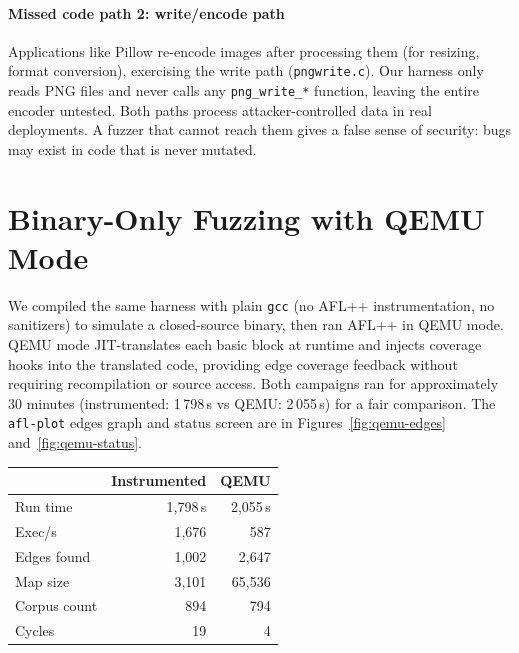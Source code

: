   \paragraph{Missed code path 2: write/encode path} Applications like Pillow re-encode images after processing them (for resizing, format conversion), exercising the write path
  (\texttt{pngwrite.c}). Our harness only reads PNG files and never calls any \texttt{png\_write\_*} function, leaving the entire encoder untested. Both paths process attacker-controlled data in real
  deployments. A fuzzer that cannot reach them gives a false sense of security: bugs may exist in code that is never mutated.
\vspace{-8pt}
\section{Binary-Only Fuzzing with QEMU Mode}
  \vspace{-7pt}
    We compiled the same harness with plain \texttt{gcc} (no AFL++
    instrumentation, no sanitizers) to simulate a closed-source binary,
    then ran AFL++ in QEMU mode. QEMU mode JIT-translates each basic
    block at runtime and injects coverage hooks into the translated code,
    providing edge coverage feedback without requiring recompilation or
    source access. Both campaigns ran for approximately 30 minutes
    (instrumented: 1\,798\,s vs QEMU: 2\,055\,s) for a fair comparison.
    The \texttt{afl-plot} edges graph and status screen are in
    Figures~\ref{fig:qemu-edges} and~\ref{fig:qemu-status}.

    \begin{table}[h]
    \centering
    \small
    \label{tab:qemu}
    \begin{tabular}{|l|r|r|}
    \hline
                      & \textbf{Instrumented} & \textbf{QEMU} \\
    \hline\hline
    Run time          & 1{,}798\,s & 2{,}055\,s \\
    Exec/s            & 1{,}676    & 587        \\
    Edges found       & 1{,}002    & 2{,}647    \\
    Map size          & 3{,}101    & 65{,}536   \\
    Corpus count      & 894        & 794        \\
    Cycles            & 19         & 4          \\
    \hline
    \end{tabular}
    \end{table}
  \vspace{-12pt}
